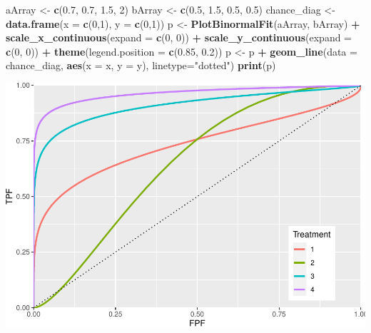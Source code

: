 \documentclass[]{book}
\newenvironment{Shaded}{\begin{snugshade}}{\end{snugshade}}
\newcommand{\DataTypeTok}[1]{\textcolor[rgb]{0.13,0.29,0.53}{#1}}
\newcommand{\DecValTok}[1]{\textcolor[rgb]{0.00,0.00,0.81}{#1}}
\newcommand{\FloatTok}[1]{\textcolor[rgb]{0.00,0.00,0.81}{#1}}
\newcommand{\KeywordTok}[1]{\textcolor[rgb]{0.13,0.29,0.53}{\textbf{#1}}}
\newcommand{\NormalTok}[1]{#1}
\newcommand{\OperatorTok}[1]{\textcolor[rgb]{0.81,0.36,0.00}{\textbf{#1}}}
\newcommand{\StringTok}[1]{\textcolor[rgb]{0.31,0.60,0.02}{#1}}
\begin{document}
\begin{Shaded}
\begin{Highlighting}[]
\NormalTok{  aArray <-}\StringTok{ }\KeywordTok{c}\NormalTok{(}\FloatTok{0.7}\NormalTok{, }\FloatTok{0.7}\NormalTok{, }\FloatTok{1.5}\NormalTok{, }\DecValTok{2}\NormalTok{)}
\NormalTok{  bArray <-}\StringTok{ }\KeywordTok{c}\NormalTok{(}\FloatTok{0.5}\NormalTok{, }\FloatTok{1.5}\NormalTok{, }\FloatTok{0.5}\NormalTok{, }\FloatTok{0.5}\NormalTok{)}
\NormalTok{  chance_diag <-}\StringTok{ }\KeywordTok{data.frame}\NormalTok{(}\DataTypeTok{x =} \KeywordTok{c}\NormalTok{(}\DecValTok{0}\NormalTok{,}\DecValTok{1}\NormalTok{), }\DataTypeTok{y =} \KeywordTok{c}\NormalTok{(}\DecValTok{0}\NormalTok{,}\DecValTok{1}\NormalTok{))}
\NormalTok{  p <-}\StringTok{ }\KeywordTok{PlotBinormalFit}\NormalTok{(aArray, bArray) }\OperatorTok{+}
\StringTok{    }\KeywordTok{scale_x_continuous}\NormalTok{(}\DataTypeTok{expand =} \KeywordTok{c}\NormalTok{(}\DecValTok{0}\NormalTok{, }\DecValTok{0}\NormalTok{)) }\OperatorTok{+}\StringTok{ }
\StringTok{    }\KeywordTok{scale_y_continuous}\NormalTok{(}\DataTypeTok{expand =} \KeywordTok{c}\NormalTok{(}\DecValTok{0}\NormalTok{, }\DecValTok{0}\NormalTok{)) }\OperatorTok{+}
\StringTok{    }\KeywordTok{theme}\NormalTok{(}\DataTypeTok{legend.position =} \KeywordTok{c}\NormalTok{(}\FloatTok{0.85}\NormalTok{, }\FloatTok{0.2}\NormalTok{))}
\NormalTok{p <-}\StringTok{ }\NormalTok{p }\OperatorTok{+}\StringTok{ }\KeywordTok{geom_line}\NormalTok{(}\DataTypeTok{data =}\NormalTok{ chance_diag, }\KeywordTok{aes}\NormalTok{(}\DataTypeTok{x =}\NormalTok{ x, }\DataTypeTok{y =}\NormalTok{ y), }\DataTypeTok{linetype=}\StringTok{"dotted"}\NormalTok{)}
\KeywordTok{print}\NormalTok{(p)}
\end{Highlighting}
\end{Shaded}

\begin{center}\includegraphics{21-improperROCs_files/figure-latex/unnamed-chunk-1-1} \end{center}
\end{document}
